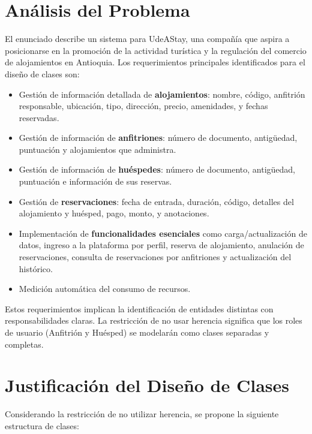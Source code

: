 \documentclass[journal]{IEEEtran}
\begin{document}
\section{Análisis del Problema}
El enunciado describe un sistema para UdeAStay, una compañía que aspira a posicionarse en la promoción de la actividad turística y la regulación del comercio de alojamientos en Antioquia. Los requerimientos principales identificados para el diseño de clases son:
\begin{itemize}
    \item Gestión de información detallada de \textbf{alojamientos}: nombre, código, anfitrión responsable, ubicación, tipo, dirección, precio, amenidades, y fechas reservadas.
    \item Gestión de información de \textbf{anfitriones}: número de documento, antigüedad, puntuación y alojamientos que administra.
    \item Gestión de información de \textbf{huéspedes}: número de documento, antigüedad, puntuación e información de sus reservas.
    \item Gestión de \textbf{reservaciones}: fecha de entrada, duración, código, detalles del alojamiento y huésped, pago, monto, y anotaciones.
    \item Implementación de \textbf{funcionalidades esenciales} como carga/actualización de datos, ingreso a la plataforma por perfil, reserva de alojamiento, anulación de reservaciones, consulta de reservaciones por anfitriones y actualización del histórico.
    \item Medición automática del consumo de recursos.
\end{itemize}
Estos requerimientos implican la identificación de entidades distintas con responsabilidades claras. La restricción de no usar herencia significa que los roles de usuario (Anfitrión y Huésped) se modelarán como clases separadas y completas.

\section{Justificación del Diseño de Clases}
Considerando la restricción de no utilizar herencia, se propone la siguiente estructura de clases:
\end{document}
